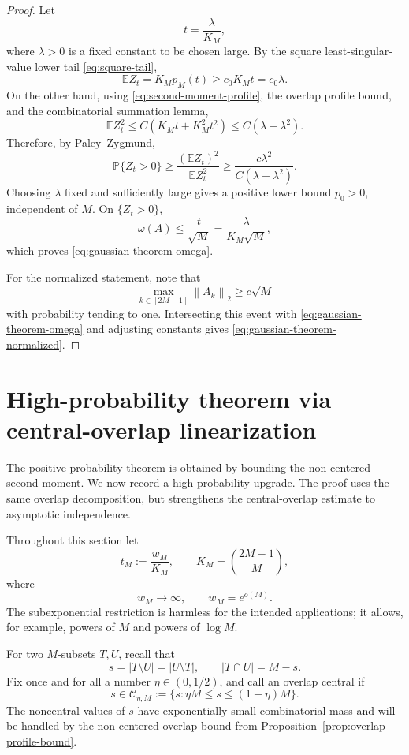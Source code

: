 \documentclass[11pt]{article}
\newcommand{\Pbb}{\mathbb P}
\newcommand{\Ebb}{\mathbb E}
\newcommand{\1}{\mathbf 1}
\newcommand{\norm}[1]{\left\lVert #1\right\rVert}
\begin{document}
\begin{proof}
Let
\[
        t=\frac{\lambda}{K_M},
\]
where \(\lambda>0\) is a fixed constant to be chosen large.  By the square
least-singular-value lower tail \eqref{eq:square-tail},
\[
        \Ebb Z_t
        =K_Mp_M(t)
        \ge
        c_0K_Mt
        =c_0\lambda.
\]
On the other hand, using \eqref{eq:second-moment-profile}, the overlap profile bound, and
the combinatorial summation lemma,
\[
        \Ebb Z_t^2
        \le
        C\left(K_Mt+K_M^2t^2\right)
        \le
        C(\lambda+\lambda^2).
\]
Therefore, by Paley--Zygmund,
\[
        \Pbb\{Z_t>0\}
        \ge
        \frac{(\Ebb Z_t)^2}{\Ebb Z_t^2}
        \ge
        \frac{c\lambda^2}{C(\lambda+\lambda^2)}.
\]
Choosing \(\lambda\) fixed and sufficiently large gives a positive lower bound
\(p_0>0\), independent of \(M\).  On \(\{Z_t>0\}\),
\[
        \omega(A)
        \le
        \frac{t}{\sqrt M}
        =
        \frac{\lambda}{K_M\sqrt M},
\]
which proves \eqref{eq:gaussian-theorem-omega}.

For the normalized statement, note that
\[
        \max_{k\in[2M-1]}\norm{A_k}_2\ge c\sqrt M
\]
with probability tending to one.  Intersecting this event with \eqref{eq:gaussian-theorem-omega}
and adjusting constants gives \eqref{eq:gaussian-theorem-normalized}.
\end{proof}

\section{High-probability theorem via central-overlap linearization}
\label{sec:high-probability}

The positive-probability theorem is obtained by bounding the non-centered second moment.
We now record a high-probability upgrade.  The proof uses the same overlap decomposition,
but strengthens the central-overlap estimate to asymptotic independence.

Throughout this section let
\[
        t_M:=\frac{w_M}{K_M},
        \qquad
        K_M=\binom{2M-1}{M},
\]
where
\[
        w_M\longrightarrow\infty,
        \qquad
        w_M=e^{o(M)}.
\]
The subexponential restriction is harmless for the intended applications; it allows, for
example, powers of \(M\) and powers of \(\log M\).

For two \(M\)-subsets \(T,U\), recall that
\[
        s=|T\setminus U|=|U\setminus T|,
        \qquad
        |T\cap U|=M-s.
\]
Fix once and for all a number \(\eta\in(0,1/2)\), and call an overlap central if
\[
        s\in\mathcal C_{\eta,M}:=\bigl\{s:\eta M\le s\le (1-\eta)M\bigr\}.
\]
The noncentral values of \(s\) have exponentially small combinatorial mass and will be
handled by the non-centered overlap bound from Proposition~\ref{prop:overlap-profile-bound}.
\end{document}
